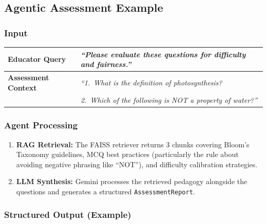 \documentclass[12pt, a4paper, twoside]{article}
\newcommand{\code}[1]{\texttt{#1}}
\begin{document}
\subsection{Agentic Assessment Example}

\subsubsection{Input}

\begin{center}
\renewcommand{\arraystretch}{1.2}
\begin{tabularx}{\textwidth}{l X}
    \toprule
    \textbf{Educator Query} & \emph{``Please evaluate these questions
    for difficulty and fairness.''} \\
    \midrule
    \textbf{Assessment Context} &
    \emph{``1.\ What is the definition of photosynthesis?}\\
    & \emph{2.\ Which of the following is NOT a property of water?''} \\
    \bottomrule
\end{tabularx}
\end{center}

\subsubsection{Agent Processing}

\begin{enumerate}[leftmargin=2em]
    \item \textbf{RAG Retrieval:} The FAISS retriever returns 3 chunks
          covering Bloom's Taxonomy guidelines, MCQ best practices
          (particularly the rule about avoiding negative phrasing like
          \enquote{NOT}), and difficulty calibration strategies.

    \item \textbf{LLM Synthesis:} Gemini processes the retrieved
          pedagogy alongside the questions and generates a structured
          \code{AssessmentReport}.
\end{enumerate}

\subsubsection{Structured Output (Example)}
\end{document}
